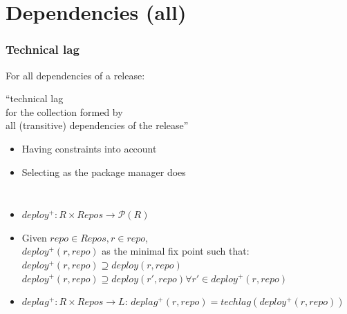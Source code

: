 \documentclass[17pt,aspectratio=169,hyperref=pdfusetitle]{beamer}
\begin{document}
\section{Dependencies (all)}

\begin{frame}[fragile]
  \frametitle{Technical lag}

  For all dependencies of a release:

  \vspace{.5cm}
  
  ``technical lag \\
  for the collection formed by \\
  all (transitive) dependencies of the release'' \\

  \vspace{.5cm}

  \begin{itemize}
  \item Having constraints into account
  \item Selecting as the package manager does
  \end{itemize}
\end{frame}

\begin{frame}[fragile]

  {\small
  \begin{columns}
    \column{\dimexpr\paperwidth-1.5cm}
  \begin{itemize}
  \item $deploy^+: R \times Repos \rightarrow \mathcal P \left({R}\right)$
  \item Given $repo \in Repos, r \in repo$, \\
    $deploy^+(r, repo)$ as the minimal fix point such that:\\
    $deploy^+(r, repo) \supseteq deploy(r, repo)$\\
    $deploy^+(r, repo) \supseteq deploy(r', repo) \forall r'\in deploy^+(r, repo)$

  \item $deplag^+: R \times Repos \rightarrow L$: $deplag^+(r, repo) = techlag(deploy^+(r, repo))$
  \end{itemize}    
  \end{columns}
  }
\end{frame}
\end{document}
